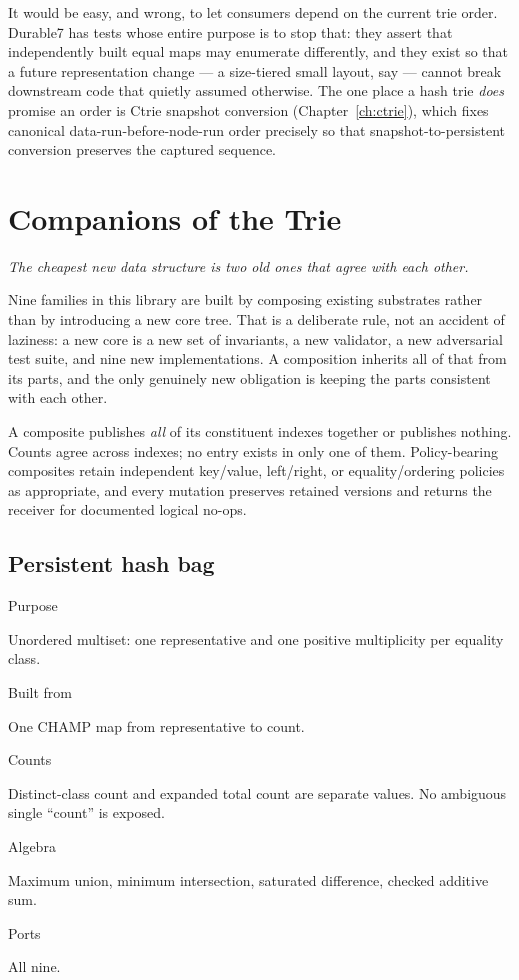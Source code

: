 \documentclass[11pt,twoside,openright]{book}
\newcommand{\code}[1]{\texorpdfstring{\textcolor{d7ink}{\texttt{#1}}}{#1}}
\newcommand{\motto}[1]{%
  \begingroup
  \vspace{-4pt}\hfill\begin{minipage}{0.80\textwidth}
    \raggedleft\itshape\color{d7slate}\small #1\par
  \end{minipage}\par\vspace{18pt}
  \endgroup}
\newcommand{\spec}[2]{%
  \par\noindent
  \parbox[t]{0.21\linewidth}{\raggedright\sffamily\bfseries\footnotesize
    \color{d7slate}\strut #1}%
  \hspace{9pt}%
  \parbox[t]{\dimexpr0.79\linewidth-9pt\relax}{\raggedright\strut #2}%
  \par\vspace{3.5pt}}
\newenvironment{specimen}[1][Specimen]
  {\begin{glancebox}[#1]\small\setlength{\parindent}{0pt}}
  {\end{glancebox}}
\begin{document}
\begin{asidebox}
It would be easy, and wrong, to let consumers depend on the current trie order.
Durable7 has tests whose entire purpose is to stop that: they assert that
independently built equal maps may enumerate differently, and they exist so that
a future representation change --- a size-tiered small layout, say --- cannot
break downstream code that quietly assumed otherwise. The one place a hash trie
\emph{does} promise an order is Ctrie snapshot conversion
(Chapter~\ref{ch:ctrie}), which fixes canonical data-run-before-node-run order
precisely so that snapshot-to-persistent conversion preserves the captured
sequence.
\end{asidebox}

\chapter{Companions of the Trie}
\label{ch:derived}

\motto{The cheapest new data structure is two old ones that agree with each
other.}

\noindent
Nine families in this library are built by composing existing substrates rather
than by introducing a new core tree. That is a deliberate rule, not an accident
of laziness: a new core is a new set of invariants, a new validator, a new
adversarial test suite, and nine new implementations. A composition inherits all
of that from its parts, and the only genuinely new obligation is keeping the
parts consistent with each other.

\begin{contractbox}
A composite publishes \emph{all} of its constituent indexes together or
publishes nothing. Counts agree across indexes; no entry exists in only one of
them. Policy-bearing composites retain independent key/value, left/right, or
equality/ordering policies as appropriate, and every mutation preserves retained
versions and returns the receiver for documented logical no-ops.
\end{contractbox}

\section{Persistent hash bag}

\begin{specimen}[Specimen --- \code{PersistentHashBag}]
%
\spec{Purpose}{Unordered multiset: one representative and one positive multiplicity per equality class.}
\spec{Built from}{One CHAMP map from representative to count.}
\spec{Counts}{Distinct-class count and expanded total count are separate values. No ambiguous single ``count'' is exposed.}
\spec{Algebra}{Maximum union, minimum intersection, saturated difference, checked additive sum.}
\spec{Ports}{All nine.}
\end{specimen}
\end{document}
